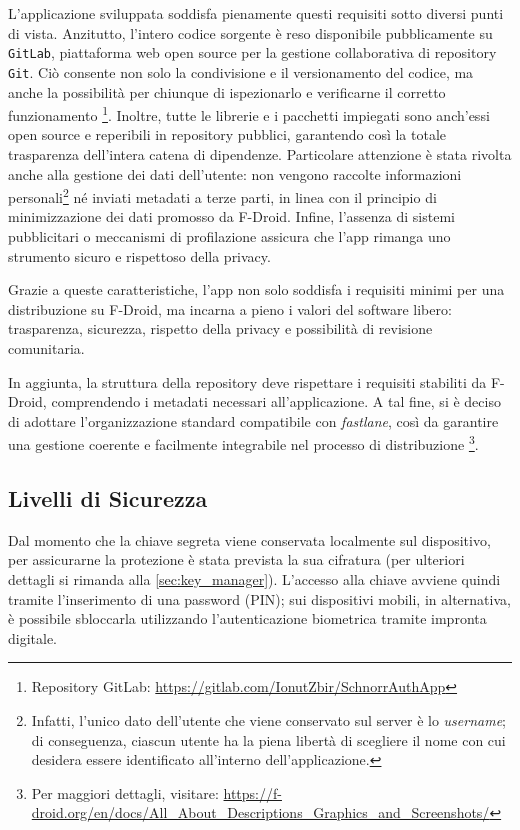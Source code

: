 L'applicazione sviluppata soddisfa pienamente questi requisiti sotto diversi punti di vista. Anzitutto, l'intero codice sorgente è reso disponibile pubblicamente su \texttt{GitLab}, piattaforma web open source per la gestione collaborativa di repository \texttt{Git}. Ciò consente non solo la condivisione e il versionamento del codice, ma anche la possibilità per chiunque di ispezionarlo e verificarne il corretto funzionamento \footnote{Repository GitLab: \url{https://gitlab.com/IonutZbir/SchnorrAuthApp}}. Inoltre, tutte le librerie e i pacchetti impiegati sono anch'essi open source e reperibili in repository pubblici, garantendo così la totale trasparenza dell'intera catena di dipendenze.
 Particolare attenzione è stata rivolta anche alla gestione dei dati dell'utente: non vengono raccolte informazioni personali\footnote{Infatti, l'unico dato dell'utente che viene conservato sul server è lo \textit{username}; di conseguenza, ciascun utente ha la piena libertà di scegliere il nome con cui desidera essere identificato all'interno dell'applicazione.}
 né inviati metadati a terze parti, in linea con il principio di minimizzazione dei dati promosso da F-Droid. Infine, l'assenza di sistemi pubblicitari o meccanismi di profilazione assicura che l'app rimanga uno strumento sicuro e rispettoso della privacy.

Grazie a queste caratteristiche, l'app non solo soddisfa i requisiti minimi per una distribuzione su F-Droid, ma incarna a pieno i valori del software libero: trasparenza, sicurezza, rispetto della privacy e possibilità di revisione comunitaria.

In aggiunta, la struttura della repository deve rispettare i requisiti stabiliti da F-Droid, comprendendo i metadati necessari all'applicazione. A tal fine, si è deciso di adottare l'organizzazione standard compatibile con \textit{fastlane}, così da garantire una gestione coerente e facilmente integrabile nel processo di distribuzione \footnote{Per maggiori dettagli, visitare: \url{https://f-droid.org/en/docs/All_About_Descriptions_Graphics_and_Screenshots/}}.

\subsection{Livelli di Sicurezza}

Dal momento che la chiave segreta viene conservata localmente sul dispositivo, per assicurarne la protezione è stata prevista la sua cifratura (per ulteriori dettagli si rimanda alla \autoref{sec:key_manager}). L'accesso alla chiave avviene quindi tramite l'inserimento di una password (PIN); sui dispositivi mobili, in alternativa, è possibile sbloccarla utilizzando l'autenticazione biometrica tramite impronta digitale.


